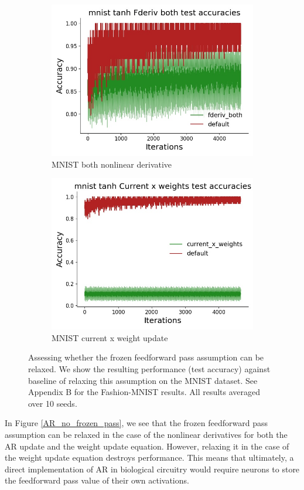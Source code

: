 \begin{figure}[htb]
\begin{subfigure}[b]{0.4\linewidth}
  \end{subfigure} 
  \begin{subfigure}[b]{0.4\linewidth}
    \centering
    \includegraphics[width=0.75\linewidth]{chapter_6_figures/AR/mnist_tanh_Fderiv_both_test_accuracies_prelim_2.jpg} 
    \caption{MNIST both nonlinear derivative} 
  \end{subfigure}%
  \begin{subfigure}[b]{0.4\linewidth}
    \centering
    \includegraphics[width=0.75\linewidth]{chapter_6_figures/AR/mnist_tanh_Current_x_weights_test_accuracies_prelim_2.jpg} 
    \caption{MNIST current x weight update} 
  \end{subfigure} 
  \caption{Assessing whether the frozen feedforward pass assumption can be relaxed. We show the resulting performance (test accuracy) against baseline of relaxing this assumption on the MNIST dataset. See Appendix B for the Fashion-MNIST results. All results averaged over 10 seeds.} \vspace{-0.2cm}
\end{figure} 

In Figure \ref{AR_no_frozen_pass}, we see that the frozen feedforward pass assumption can be relaxed in the case of the nonlinear derivatives for both the AR update and the weight update equation. However, relaxing it in the case of the weight update equation destroys performance. This means that ultimately, a direct implementation of AR in biological circuitry would require neurons to store the feedforward pass value of their own activations. 

